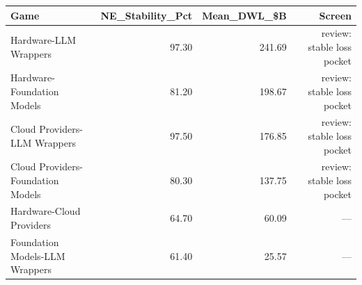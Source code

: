 

\begin{tabular}{@{}lrrr@{}}
\toprule
Game & NE\_Stability\_Pct & Mean\_DWL\_\$B & Screen \\
\midrule
Hardware-LLM Wrappers & 97.30 & 241.69 & review: stable loss pocket \\
Hardware-Foundation Models & 81.20 & 198.67 & review: stable loss pocket \\
Cloud Providers-LLM Wrappers & 97.50 & 176.85 & review: stable loss pocket \\
Cloud Providers-Foundation Models & 80.30 & 137.75 & review: stable loss pocket \\
Hardware-Cloud Providers & 64.70 & 60.09 & — \\
Foundation Models-LLM Wrappers & 61.40 & 25.57 & — \\
\bottomrule
\end{tabular}